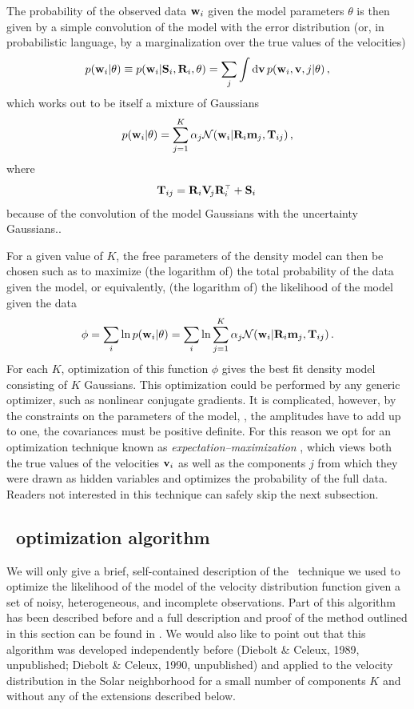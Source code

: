 The probability of the observed data $\mathbf{w}_i$ given the model parameters
$\theta$ is then given by a simple convolution of the model with the
error distribution (or, in probabilistic language, by a
marginalization over the true values of the velocities)
\begin{equation}
p(\mathbf{w}_i|\theta) \equiv p(\mathbf{w}_i|\mathbf{S}_i,\mathbf{R}_i,\theta) =\sum_j\int \mathrm{d}\boldsymbol{\mathbf{v}}\, p(\mathbf{w}_i,\boldsymbol{\mathbf{v}},j|\theta)\, ,
\end{equation}
which works out to be itself a mixture of Gaussians
\begin{equation}
p(\mathbf{w}_i|\theta)  = \sum_{j=1}^K \alpha_j \mathcal{N}(\mathbf{w}_i|\mathbf{R}_i\mathbf{m}_j,\mathbf{T}_{ij})\, ,
\end{equation}
where
\begin{equation}
\mathbf{T}_{ij} = \mathbf{R}_i\mathbf{V}_{\!j}\mathbf{R}_i^{\scriptscriptstyle \top} + \mathbf{S}_i\, 
\end{equation}
because of the convolution of the model Gaussians with the uncertainty
Gaussians..

For a given value of $K$, the free parameters of the density model can
then be chosen such as to maximize (the logarithm of) the total
probability of the data given the model, or equivalently, (the
logarithm of) the likelihood of the model given the data
\begin{equation}\label{eq:likelihood}
\phi = \sum_i \ln p(\mathbf{w}_i|\theta) = \sum_i \ln \sum_{j=1}^K \alpha_j \mathcal{N}(\mathbf{w}_i|\mathbf{R}_i\mathbf{m}_j,\mathbf{T}_{ij})\, .
\end{equation}
For each $K$, optimization of this function $\phi$ gives the best fit
density model consisting of $K$ Gaussians. This optimization could be
performed by any generic optimizer, such as nonlinear conjugate
gradients. It is complicated, however, by the constraints on the
parameters of the model, \eg, the amplitudes have to add up to one,
the covariances must be positive definite. For this reason we opt for
an optimization technique known as \emph{expectation--maximization}
\citep[\EM;][]{Dempster1977}, which views both the true values of the
velocities $\boldsymbol{\mathbf{v}}_i$ as well as the components $j$ from which they were
drawn as hidden variables and optimizes the probability of the
full data. Readers not interested in this technique can safely skip
the next subsection.



\subsection{\EM\ optimization algorithm}

We will only give a brief, self-contained description of the \EM\
technique we used to optimize the likelihood of the model of the
velocity distribution function given a set of noisy, heterogeneous,
and incomplete observations. Part of this algorithm has been described
before \citep[see the appendix of][]{2005ApJ...629..268H} and a full
description and proof of the method outlined in this section can be
found in \citet{BovyXD}. We would also like to point out that this
algorithm was developed independently before (Diebolt \& Celeux, 1989,
unpublished; Diebolt \& Celeux, 1990, unpublished) and applied to the
velocity distribution in the Solar neighborhood
\citep{1990A&A...236...95G,1997ESASP.402..519F} for a small number of
components $K$ and without any of the extensions described below.

